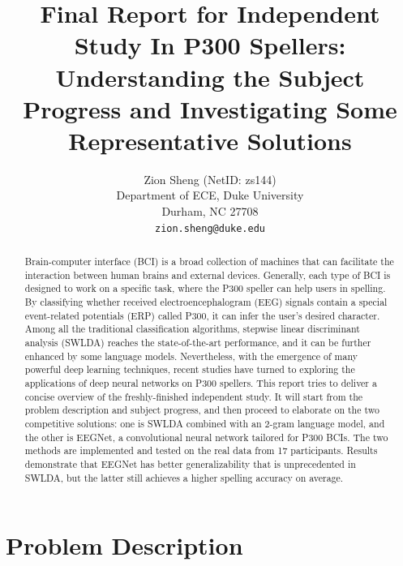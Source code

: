 \documentclass{article}
\title{Final Report for Independent Study In P300 Spellers: Understanding the Subject Progress and Investigating Some Representative Solutions}
\author{
	Zion Sheng (NetID: zs144)\\
	Department of ECE, Duke University\\
	Durham, NC 27708 \\
	\texttt{zion.sheng@duke.edu} \\
}
\date{} %
\begin{document}
\maketitle

\vspace{-10mm}
\begin{abstract}
	Brain-computer interface (BCI) is a broad collection of machines that can facilitate the interaction between human brains and external devices. Generally, each type of BCI is designed to work on a specific task, where the P300 speller can help users in spelling. By classifying whether received electroencephalogram (EEG) signals contain a special event-related potentials (ERP) called P300, it can infer the user's desired character. Among all the traditional classification algorithms, stepwise linear discriminant analysis (SWLDA) reaches the state-of-the-art performance, and it can be further enhanced by some language models. Nevertheless, with the emergence of many powerful deep learning techniques, recent studies have turned to exploring the applications of deep neural networks on P300 spellers. This report tries to deliver a concise overview of the freshly-finished independent study. It will start from the problem description and subject progress, and then proceed to elaborate on the two competitive solutions: one is SWLDA combined with an 2-gram language model, and the other is EEGNet, a convolutional neural network tailored for P300 BCIs. The two methods are implemented and tested on the real data from 17 participants. Results demonstrate that EEGNet has better generalizability that is unprecedented in SWLDA, but the latter still achieves a higher spelling accuracy on average.
\end{abstract}




\section{Problem Description} \label{Description}
\end{document}
